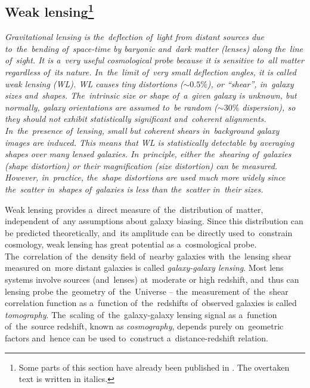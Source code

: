 \subsection[Weak lensing]{Weak lensing\footnote{Some parts of this section have already been published in \textcite{mastersthesis_vrastil}. The overtaken text is written in italics.}}
\label{ssec:wl}
{\itshape
Gravitational lensing is the~deflection of~light from distant sources due to~the~bending of~space-time by baryonic and~dark matter (lenses) along the~line of~sight. It is a~very useful cosmological probe because it is sensitive to~all matter regardless of~its nature. In~the~limit of~very small deflection angles, it is called weak lensing (WL). WL causes tiny distortions ($\sim0.5\%$), or ``shear'', in~galaxy sizes and~shapes. The~intrinsic size or shape of~a~given galaxy is unknown, but normally, galaxy orientations are assumed to~be random ($\sim30\%$ dispersion), so they should not exhibit statistically significant and~coherent alignments. In~the~presence of~lensing, small but coherent shears in~background galaxy images are induced. This means that WL is statistically detectable by averaging shapes over many lensed galaxies. In~principle, either the~shearing of~galaxies (shape distortion) or their magnification (size distortion) can be measured. However, in~practice, the~shape distortions are used much more widely since the~scatter in~shapes of~galaxies is less than the~scatter in~their sizes.

Weak lensing provides a~direct measure of~the~distribution of~matter, independent of~any assumptions about galaxy biasing. Since this distribution can be predicted theoretically, and~its amplitude can be directly used to~constrain cosmology, weak lensing has great potential as a~cosmological probe. The~correlation of~the~density field of~nearby galaxies with~the~lensing shear measured on~more distant galaxies is called \textit{galaxy-galaxy lensing}. Most lens systems involve sources (and~lenses) at~moderate or high redshift, and~thus can lensing probe the~geometry of~the~Universe -- the~measurement of~the~shear correlation function as a~function of~the~redshifts of~observed galaxies is called \textit{tomography}. The~scaling of~the~galaxy-galaxy lensing signal as a~function of~the~source redshift, known as \textit{cosmography}, depends purely on~geometric factors and~hence can be used to~construct a~distance-redshift relation.
}
